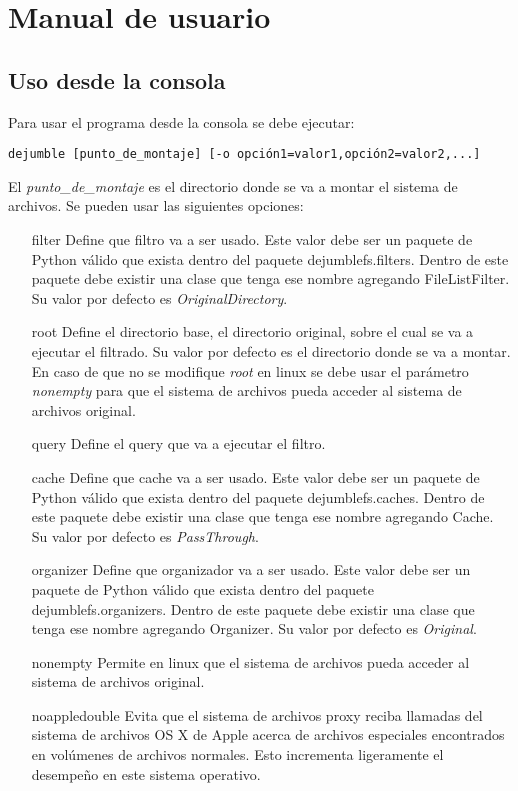 \chapter{Manual de usuario}
\ifpdf
    \graphicspath{{Appendix2/Appendix2Figs/PNG/}{Appendix2/Appendix2Figs/PDF/}{Appendix2/Appendix2Figs/}}
\else
    \graphicspath{{Appendix2/Appendix2Figs/EPS/}{Appendix2/Appendix2Figs/}}
\fi

\section{Uso desde la consola}

Para usar el programa desde la consola se debe ejecutar:

\begin{verbatim}
dejumble [punto_de_montaje] [-o opción1=valor1,opción2=valor2,...]
\end{verbatim}

El \textit{punto\_de\_montaje} es el directorio donde se va a montar el sistema de archivos. Se pueden usar las siguientes opciones:

\begin{itemize}
\item[filter] Define que filtro va a ser usado. Este valor debe ser un paquete de Python válido que exista dentro del paquete dejumblefs.filters. Dentro de este paquete debe existir una clase que tenga ese nombre agregando FileListFilter. Su valor por defecto es \textit{OriginalDirectory}.
\item[root] Define el directorio base, el directorio original, sobre el cual se va a ejecutar el filtrado. Su valor por defecto es el directorio donde se va a montar. En caso de que no se modifique \textit{root} en linux se debe usar el parámetro \textit{nonempty} para que el sistema de archivos pueda acceder al sistema de archivos original.
\item[query] Define el query que va a ejecutar el filtro.
\item[cache] Define que cache va a ser usado. Este valor debe ser un paquete de Python válido que exista dentro del paquete dejumblefs.caches. Dentro de este paquete debe existir una clase que tenga ese nombre agregando Cache. Su valor por defecto es \textit{PassThrough}.
\item[organizer] Define que organizador va a ser usado. Este valor debe ser un paquete de Python válido que exista dentro del paquete dejumblefs.organizers. Dentro de este paquete debe existir una clase que tenga ese nombre agregando Organizer. Su valor por defecto es \textit{Original}.
\item[nonempty] Permite en linux que el sistema de archivos pueda acceder al sistema de archivos original.
\item[noappledouble] Evita que el sistema de archivos proxy reciba llamadas del sistema de archivos OS X de Apple acerca de archivos especiales encontrados en volúmenes de archivos normales. Esto incrementa ligeramente el desempeño en este sistema operativo.
\end{itemize}

